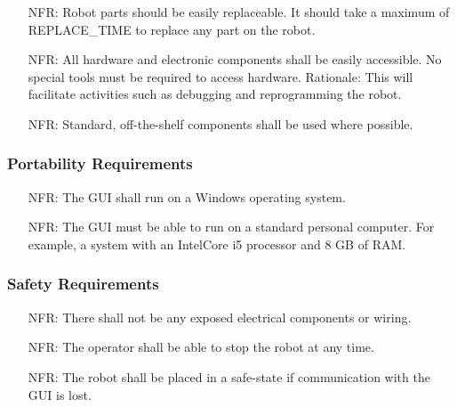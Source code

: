 \documentclass[12pt]{article}
\newcounter{nfrnum} %
\begin{document}
\noindent \begin{itemize}
\item[NFR\refstepcounter{nfrnum}\thenfrnum \label{NFR_Maintainability1}:] Robot parts should be easily replaceable. It should take a maximum of REPLACE\_TIME to replace any part on the robot.
\item[NFR\refstepcounter{nfrnum}\thenfrnum \label{NFR_Maintainability2}:] All hardware and electronic components shall be easily accessible. No special tools must be required to access hardware. 
\newline Rationale: This will facilitate activities such as debugging and reprogramming the robot. 
\item[NFR\refstepcounter{nfrnum}\thenfrnum \label{NFR_Maintainability3}:] Standard, off-the-shelf components shall be used where possible. 
\end{itemize}

\subsubsection{Portability Requirements}

\noindent \begin{itemize}
\item[NFR\refstepcounter{nfrnum}\thenfrnum \label{NFR_Portability1}:] The GUI shall run on a Windows operating system.
\item[NFR\refstepcounter{nfrnum}\thenfrnum \label{NFR_Portability2}:] The GUI must be able to run on a standard personal computer. For example, a system with an IntelCore i5 processor and 8 GB of RAM.
\end{itemize}

\subsubsection{Safety Requirements}
\noindent \begin{itemize}
\item[NFR\refstepcounter{nfrnum}\thenfrnum \label{NFR_Safety1}:] There shall not be any exposed electrical components or wiring.
\item[NFR\refstepcounter{nfrnum}\thenfrnum \label{NFR_Safety2}:] The operator shall be able to stop the robot at any time.
\item[NFR\refstepcounter{nfrnum}\thenfrnum \label{NFR_Safety3}:] The robot shall be placed in a safe-state if communication with the GUI is lost.
\end{itemize}
\end{document}
